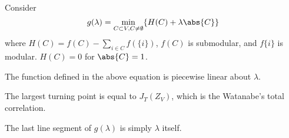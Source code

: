 Consider
\begin{equation}
g(\lambda) = \min_{C\subset V, C\neq \emptyset} \{ H(C) + \lambda\abs{C}\}
\end{equation}
where $H(C) = f(C) - \sum_{i\in C} f(\{i\})$, $f(C)$ is submodular, and $f\{i\}$ is modular.
$H(C)=0$ for $\abs{C}=1$.

The function defined in the above equation is piecewise linear about $\lambda$.

The largest turning point is equal to $J_T(Z_V)$, which is the Watanabe's total correlation.

The last line segment of $g(\lambda)$ is simply $\lambda$ itself.